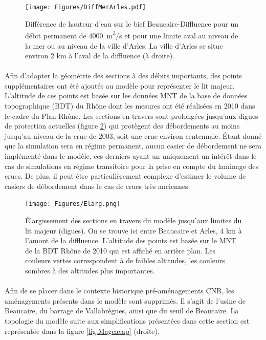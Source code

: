 \documentclass[11pt]{article}
\begin{document}
	\begin{figure}[h]
	\centering
		\texttt{[image: Figures/DiffMerArles.pdf]}
        \caption{Différence de hauteur d'eau sur le bief Beaucaire-Diffluence pour un débit permanent de 4000~m\textsuperscript{3}/s et pour une limite aval au niveau de la mer ou au niveau de la ville d'Arles. La ville d'Arles se situe environ 2 km à l'aval de la diffluence (à droite).}
		\label{fig:DifMerArles}
	\end{figure}			 
	 	
\FloatBarrier

	\paragraph{} Afin d'adapter la géométrie des sections à des débits importants, des points supplémentaires ont été ajoutés au modèle pour représenter le lit majeur. L'altitude de ces points est basée sur les données MNT de la base de données topographique (BDT) du Rhône dont les mesures ont été réalisées en 2010 dans le cadre du Plan Rhône. Les sections en travers sont prolongées jusqu'aux digues de protection actuelles (figure \ref{fig:Elarg}) qui protègent des débordements au moins jusqu'au niveau de la crue de 2003, soit une crue environ centennale. Étant donné que la simulation sera en régime permanent, aucun casier de débordement ne sera implémenté dans le modèle, ces derniers ayant un uniquement un intérêt dans le cas de simulations en régime transitoire pour la prise en compte du laminage des crues. De plus, il peut être particulièrement complexe d'estimer le volume de casiers de débordement dans le cas de crues très anciennes.
	
	\begin{figure}[h]
	\centering
		\texttt{[image: Figures/Elarg.png]}
        \caption{Élargissement des sections en travers du modèle jusqu'aux limites du lit majeur (digues). On se trouve ici entre Beaucaire et Arles, 4 km à l'amont de la diffluence. L'altitude des points est basée sur le MNT de la BDT Rhône de 2010 qui est affiché en arrière plan. Les couleurs vertes correspondent à de faibles altitudes, les couleurs sombres à des altitudes plus importantes.}
		\label{fig:Elarg}
	\end{figure}		
	
	\paragraph{} Afin de se placer dans le contexte historique pré-aménagements CNR, les aménagements présents dans le modèle sont supprimés. Il s'agit de l'usine de Beaucaire, du barrage de Vallabrègues, ainsi que du seuil de Beaucaire. La topologie du modèle suite aux simplifications présentées dans cette section est représentée dans la figure \ref{fig:Mageavap} (droite).
	
\end{document}
